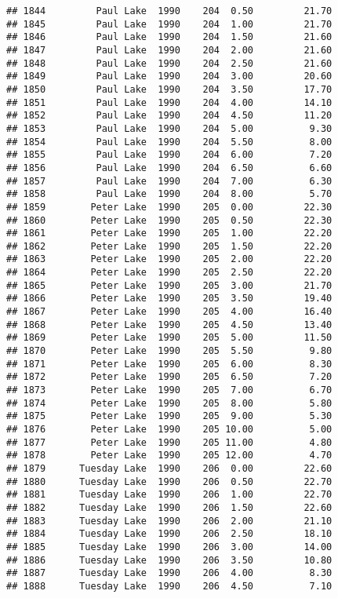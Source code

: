 \documentclass[
]{article}
\begin{document}
\begin{verbatim}
## 1844         Paul Lake  1990    204  0.50         21.70
## 1845         Paul Lake  1990    204  1.00         21.70
## 1846         Paul Lake  1990    204  1.50         21.60
## 1847         Paul Lake  1990    204  2.00         21.60
## 1848         Paul Lake  1990    204  2.50         21.60
## 1849         Paul Lake  1990    204  3.00         20.60
## 1850         Paul Lake  1990    204  3.50         17.70
## 1851         Paul Lake  1990    204  4.00         14.10
## 1852         Paul Lake  1990    204  4.50         11.20
## 1853         Paul Lake  1990    204  5.00          9.30
## 1854         Paul Lake  1990    204  5.50          8.00
## 1855         Paul Lake  1990    204  6.00          7.20
## 1856         Paul Lake  1990    204  6.50          6.60
## 1857         Paul Lake  1990    204  7.00          6.30
## 1858         Paul Lake  1990    204  8.00          5.70
## 1859        Peter Lake  1990    205  0.00         22.30
## 1860        Peter Lake  1990    205  0.50         22.30
## 1861        Peter Lake  1990    205  1.00         22.20
## 1862        Peter Lake  1990    205  1.50         22.20
## 1863        Peter Lake  1990    205  2.00         22.20
## 1864        Peter Lake  1990    205  2.50         22.20
## 1865        Peter Lake  1990    205  3.00         21.70
## 1866        Peter Lake  1990    205  3.50         19.40
## 1867        Peter Lake  1990    205  4.00         16.40
## 1868        Peter Lake  1990    205  4.50         13.40
## 1869        Peter Lake  1990    205  5.00         11.50
## 1870        Peter Lake  1990    205  5.50          9.80
## 1871        Peter Lake  1990    205  6.00          8.30
## 1872        Peter Lake  1990    205  6.50          7.20
## 1873        Peter Lake  1990    205  7.00          6.70
## 1874        Peter Lake  1990    205  8.00          5.80
## 1875        Peter Lake  1990    205  9.00          5.30
## 1876        Peter Lake  1990    205 10.00          5.00
## 1877        Peter Lake  1990    205 11.00          4.80
## 1878        Peter Lake  1990    205 12.00          4.70
## 1879      Tuesday Lake  1990    206  0.00         22.60
## 1880      Tuesday Lake  1990    206  0.50         22.70
## 1881      Tuesday Lake  1990    206  1.00         22.70
## 1882      Tuesday Lake  1990    206  1.50         22.60
## 1883      Tuesday Lake  1990    206  2.00         21.10
## 1884      Tuesday Lake  1990    206  2.50         18.10
## 1885      Tuesday Lake  1990    206  3.00         14.00
## 1886      Tuesday Lake  1990    206  3.50         10.80
## 1887      Tuesday Lake  1990    206  4.00          8.30
## 1888      Tuesday Lake  1990    206  4.50          7.10

\end{verbatim}
\end{document}
